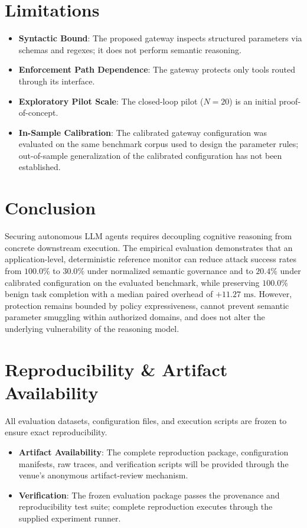\documentclass[10pt,twocolumn,letterpaper]{article}
\begin{document}
\section{Limitations}
\begin{itemize}
    \item \textbf{Syntactic Bound}: The proposed gateway inspects structured parameters via schemas and regexes; it does not perform semantic reasoning.
    \item \textbf{Enforcement Path Dependence}: The gateway protects only tools routed through its interface.
    \item \textbf{Exploratory Pilot Scale}: The closed-loop pilot ($N=20$) is an initial proof-of-concept.
    \item \textbf{In-Sample Calibration}: The calibrated gateway configuration was evaluated on the same benchmark corpus used to design the parameter rules; out-of-sample generalization of the calibrated configuration has not been established.
\end{itemize}

\section{Conclusion}
Securing autonomous LLM agents requires decoupling cognitive reasoning from concrete downstream execution. The empirical evaluation demonstrates that an application-level, deterministic reference monitor can reduce attack success rates from $100.0\%$ to $30.0\%$ under normalized semantic governance and to $20.4\%$ under calibrated configuration on the evaluated benchmark, while preserving $100.0\%$ benign task completion with a median paired overhead of $+11.27\text{ ms}$. However, protection remains bounded by policy expressiveness, cannot prevent semantic parameter smuggling within authorized domains, and does not alter the underlying vulnerability of the reasoning model.

\section{Reproducibility \& Artifact Availability}
All evaluation datasets, configuration files, and execution scripts are frozen to ensure exact reproducibility.
\begin{itemize}
    \item \textbf{Artifact Availability}: The complete reproduction package, configuration manifests, raw traces, and verification scripts will be provided through the venue's anonymous artifact-review mechanism.
    \item \textbf{Verification}: The frozen evaluation package passes the provenance and reproducibility test suite; complete reproduction executes through the supplied experiment runner.
\end{itemize}
\end{document}
